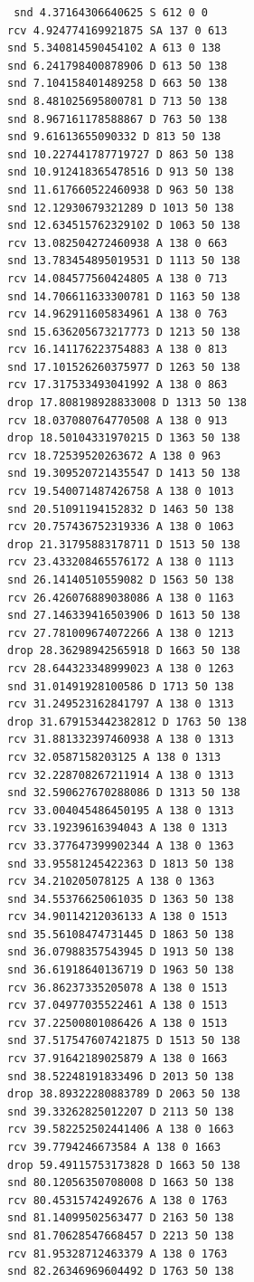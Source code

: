 \documentclass[11pt]{article}
\begin{document}
\begin{verbatim}
 snd 4.37164306640625 S 612 0 0
rcv 4.924774169921875 SA 137 0 613
snd 5.340814590454102 A 613 0 138
snd 6.241798400878906 D 613 50 138
snd 7.104158401489258 D 663 50 138
snd 8.481025695800781 D 713 50 138
snd 8.967161178588867 D 763 50 138
snd 9.61613655090332 D 813 50 138
snd 10.227441787719727 D 863 50 138
snd 10.912418365478516 D 913 50 138
snd 11.617660522460938 D 963 50 138
snd 12.12930679321289 D 1013 50 138
snd 12.634515762329102 D 1063 50 138
rcv 13.082504272460938 A 138 0 663
snd 13.783454895019531 D 1113 50 138
rcv 14.084577560424805 A 138 0 713
snd 14.706611633300781 D 1163 50 138
rcv 14.962911605834961 A 138 0 763
snd 15.636205673217773 D 1213 50 138
rcv 16.141176223754883 A 138 0 813
snd 17.101526260375977 D 1263 50 138
rcv 17.317533493041992 A 138 0 863
drop 17.808198928833008 D 1313 50 138
rcv 18.037080764770508 A 138 0 913
drop 18.50104331970215 D 1363 50 138
rcv 18.72539520263672 A 138 0 963
snd 19.309520721435547 D 1413 50 138
rcv 19.540071487426758 A 138 0 1013
snd 20.51091194152832 D 1463 50 138
rcv 20.757436752319336 A 138 0 1063
drop 21.31795883178711 D 1513 50 138
rcv 23.433208465576172 A 138 0 1113
snd 26.14140510559082 D 1563 50 138
rcv 26.426076889038086 A 138 0 1163
snd 27.146339416503906 D 1613 50 138
rcv 27.781009674072266 A 138 0 1213
drop 28.36298942565918 D 1663 50 138
rcv 28.644323348999023 A 138 0 1263
snd 31.01491928100586 D 1713 50 138
rcv 31.249523162841797 A 138 0 1313
drop 31.679153442382812 D 1763 50 138
rcv 31.881332397460938 A 138 0 1313
rcv 32.0587158203125 A 138 0 1313
rcv 32.228708267211914 A 138 0 1313
snd 32.590627670288086 D 1313 50 138
rcv 33.004045486450195 A 138 0 1313
rcv 33.19239616394043 A 138 0 1313
rcv 33.377647399902344 A 138 0 1363
snd 33.95581245422363 D 1813 50 138
rcv 34.210205078125 A 138 0 1363
snd 34.55376625061035 D 1363 50 138
rcv 34.90114212036133 A 138 0 1513
snd 35.56108474731445 D 1863 50 138
snd 36.07988357543945 D 1913 50 138
snd 36.61918640136719 D 1963 50 138
rcv 36.86237335205078 A 138 0 1513
rcv 37.04977035522461 A 138 0 1513
rcv 37.22500801086426 A 138 0 1513
snd 37.517547607421875 D 1513 50 138
rcv 37.91642189025879 A 138 0 1663
snd 38.52248191833496 D 2013 50 138
drop 38.89322280883789 D 2063 50 138
snd 39.33262825012207 D 2113 50 138
rcv 39.582252502441406 A 138 0 1663
rcv 39.7794246673584 A 138 0 1663
drop 59.49115753173828 D 1663 50 138
snd 80.12056350708008 D 1663 50 138
rcv 80.45315742492676 A 138 0 1763
snd 81.14099502563477 D 2163 50 138
snd 81.70628547668457 D 2213 50 138
rcv 81.95328712463379 A 138 0 1763
snd 82.26346969604492 D 1763 50 138

\end{verbatim}
\end{document}
